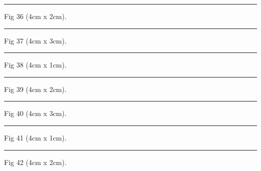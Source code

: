 \documentclass[a4paper,11pt]{article}
\begin{document}
\begin{swarmwrap}%
  \begin{minipage}[t]{4cm}
    \centering
    \rule{\linewidth}{2cm}
    {\footnotesize Fig 36 (4cm x 2cm).}
  \end{minipage}%
\end{swarmwrap}%
\swarmwrapnext
\lipsum[36]%

\begin{swarmwrap}%
  \begin{minipage}[t]{4cm}
    \centering
    \rule{\linewidth}{3cm}
    {\footnotesize Fig 37 (4cm x 3cm).}
  \end{minipage}%
\end{swarmwrap}%
\swarmwrapnext
\lipsum[37]%

\begin{swarmwrap}%
  \begin{minipage}[t]{4cm}
    \centering
    \rule{\linewidth}{1cm}
    {\footnotesize Fig 38 (4cm x 1cm).}
  \end{minipage}%
\end{swarmwrap}%
\swarmwrapnext
\lipsum[38]%

\begin{swarmwrap}%
  \begin{minipage}[t]{4cm}
    \centering
    \rule{\linewidth}{2cm}
    {\footnotesize Fig 39 (4cm x 2cm).}
  \end{minipage}%
\end{swarmwrap}%
\swarmwrapnext
\lipsum[39]%

\begin{swarmwrap}%
  \begin{minipage}[t]{4cm}
    \centering
    \rule{\linewidth}{3cm}
    {\footnotesize Fig 40 (4cm x 3cm).}
  \end{minipage}%
\end{swarmwrap}%
\swarmwrapnext
\lipsum[40]%

\begin{swarmwrap}%
  \begin{minipage}[t]{4cm}
    \centering
    \rule{\linewidth}{1cm}
    {\footnotesize Fig 41 (4cm x 1cm).}
  \end{minipage}%
\end{swarmwrap}%
\swarmwrapnext
\lipsum[41]%

\begin{swarmwrap}%
  \begin{minipage}[t]{4cm}
    \centering
    \rule{\linewidth}{2cm}
    {\footnotesize Fig 42 (4cm x 2cm).}
  \end{minipage}%
\end{swarmwrap}%
\swarmwrapnext
\lipsum[42]%
\end{document}

